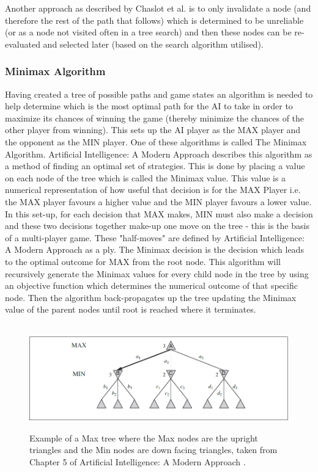 \documentclass[journal]{IEEEtran}
\begin{document}
  Another approach as described by Chaslot et al. \cite{progressive} is to only invalidate a node (and therefore the rest of the path that follows) which is determined to be unreliable (or as a node not visited often in a tree search) and then these nodes can be re-evaluated and selected later (based on the search algorithm utilised).\\
  
  \subsubsection{Minimax Algorithm}
  Having created a tree of possible paths and game states an algorithm is needed to help determine which is the most optimal path for the AI to take in order to maximize its chances of winning the game (thereby minimize the chances of the other player from winning). This sets up the AI player as the MAX player and the opponent as the MIN player. One of these algorithms is called The Minimax Algorithm. Artificial Intelligence: A Modern Approach \cite{AIModern} describes this algorithm as a method of finding an optimal set of strategies. This is done by placing a value on each node of the tree which is called the Minimax value. This value is a numerical representation of how useful that decision is for the MAX Player i.e. the MAX player favours a higher value and the MIN player favours a lower value. In this set-up, for each decision that MAX makes, MIN must also make a decision and these two decisions together make-up one move on the tree - this is the basis of a multi-player game. These "half-moves" are defined by Artificial Intelligence: A Modern Approach \cite{AIModern} as a ply. The Minimax decision is the decision which leads to the optimal outcome for MAX from the root node. This algorithm will recursively generate the Minimax values for every child node in the tree by using an objective function which determines the numerical outcome of that specific node. Then the algorithm back-propagates up the tree updating the Minimax value of the parent nodes until root is reached where it terminates. \\
  \\
  \begin{figure}[H]
    \includegraphics[width=.50\textwidth,scale=.50]{minimax}\\
    \centering
    \caption{Example of a Max tree where the Max nodes are the upright triangles and the Min nodes are down facing triangles, taken from Chapter 5 of Artificial Intelligence: A Modern Approach \cite{AIModern}.}
    \label{ab}
  \end{figure}
  
\end{document}
